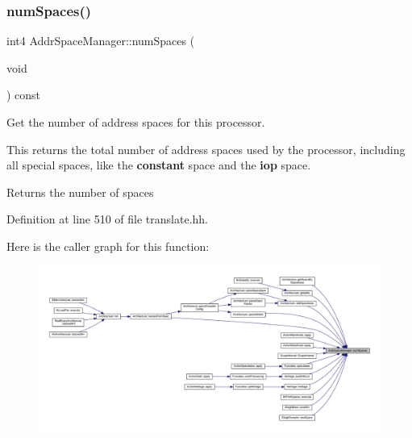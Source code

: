 \subsubsection{\texorpdfstring{numSpaces()}{numSpaces()}}
{\footnotesize\ttfamily int4 Addr\+Space\+Manager\+::num\+Spaces (\begin{DoxyParamCaption}\item[{void}]{ }\end{DoxyParamCaption}) const\hspace{0.3cm}{\ttfamily [inline]}}



Get the number of address spaces for this processor. 

This returns the total number of address spaces used by the processor, including all special spaces, like the {\bfseries{constant}} space and the {\bfseries{iop}} space. \begin{DoxyReturn}{Returns}
the number of spaces 
\end{DoxyReturn}


Definition at line 510 of file translate.\+hh.

Here is the caller graph for this function\+:
\nopagebreak
\begin{figure}[H]
\begin{center}
\leavevmode
\includegraphics[width=350pt]{class_addr_space_manager_ae2d22102a7ce6080918e82daafabbdfa_icgraph}
\end{center}
\end{figure}
\mbox{\label{class_addr_space_manager_a346fe23bba76b07c9fe7ddea82995e1f}} 
